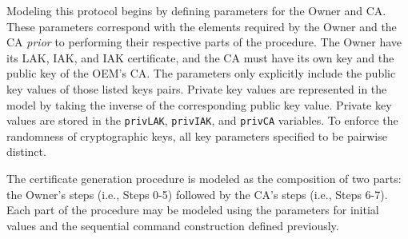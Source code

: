 \documentclass[runningheads]{llncs}
\begin{document}
Modeling this protocol begins by defining parameters for the Owner and
CA. These parameters correspond with the elements required by the
Owner and the CA \emph{prior} to performing their respective parts of
the procedure.  The Owner have its LAK, IAK, and IAK certificate, and
the CA must have its own key and the public key of the OEM's CA. The
parameters only explicitly include the public key values of those
listed keys pairs. Private key values are represented in the model by
taking the inverse of the corresponding public key value. Private key
values are stored in the \verb|privLAK|, \verb|privIAK|, and
\verb|privCA| variables. To enforce the randomness of cryptographic
keys, all key parameters specified to be pairwise distinct.




The certificate generation procedure is modeled as the composition of
two parts: the Owner's steps (i.e., Steps 0-5) followed by the CA's
steps (i.e., Steps 6-7).  Each part of the procedure may be modeled
using the parameters for initial values and the sequential command
construction defined previously.
\end{document}
